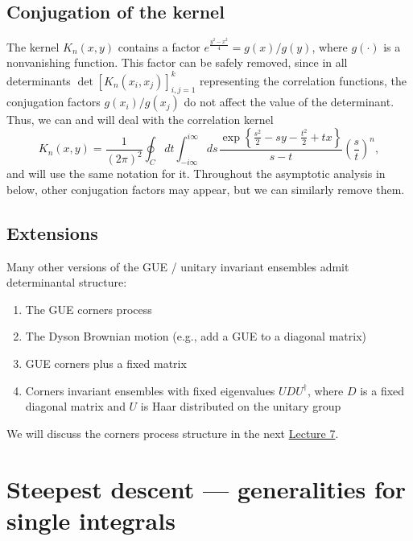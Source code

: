 \documentclass[letterpaper,11pt,oneside,reqno]{article}
\numberwithin{equation}{section}
\newcommand{\ssp}{\hspace{1pt}}
\theoremstyle{definition}
\begin{document}
\subsection{Conjugation of the kernel}

The kernel $K_n(x,y)$ contains a factor $e^{\frac{y^2-x^2}{4}}=g(x)/g(y)$,
where $g(\cdot)$ is a nonvanishing function. This factor can be safely removed, since
in all determinants
$\det[K_n(x_i,x_j)]_{i,j=1}^k$
representing the correlation functions, the
conjugation factors $g(x_i)/g(x_j)$ do not affect the value of the determinant.
Thus, we can and will deal with the correlation kernel
\begin{equation}
	\label{eq:K_n_conjugated}
	K_n(x,y)=\frac{1}{(2\pi)^2}
	\oint_C dt\int_{-i\infty}^{i\infty}ds\ssp
	\frac{\exp\left\{ \frac{s^2}{2}-sy-\frac{t^2}{2}+tx \right\}}{s-t}\left( \frac{s}{t} \right)^n
	,
\end{equation}
and will use the same notation for it.
Throughout the asymptotic analysis in  below,
other conjugation factors may appear, but we can similarly
remove them.

\subsection{Extensions}

Many other versions of the GUE / unitary invariant ensembles admit determinantal structure:
\begin{enumerate}
	\item The GUE corners process \cite{johansson2006eigenvalues}
    \item The Dyson Brownian motion (e.g., add a GUE to a diagonal matrix)
			\cite{nagao1998multilevel}
		\item GUE corners plus a fixed matrix \cite{Ferrari2014PerturbedGUE}
    \item Corners invariant ensembles with fixed eigenvalues $UDU^\dagger$, where $D$ is a fixed diagonal matrix and $U$ is Haar distributed
			on the unitary group \cite{Metcalfe2011GT}
	\end{enumerate}

We will discuss the corners process structure
in the next
\href{https://lpetrov.cc/rmt25/rmt25-notes/rmt2025-l07.pdf}{Lecture 7}.


\section{Steepest descent --- generalities for single integrals}
\end{document}
